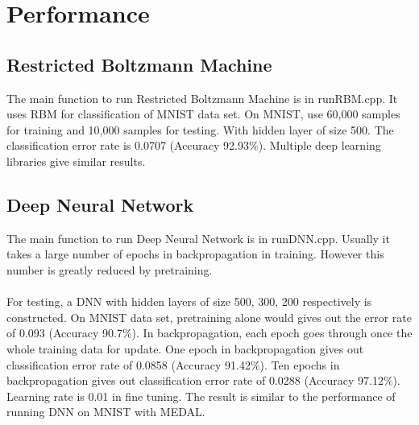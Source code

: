 \documentclass[12pt]{article}
\begin{document}
\section{Performance}
\subsection{Restricted Boltzmann Machine}
The main function to run Restricted Boltzmann Machine is in runRBM.cpp. It uses RBM for classification of MNIST data set. On MNIST, use 60,000 samples for training and 10,000 samples for testing. With hidden layer of size 500. The classification error rate is 0.0707 (Accuracy 92.93$\%$). Multiple deep learning libraries give similar results.
\subsection{Deep Neural Network}
The main function to run Deep Neural Network is in runDNN.cpp. Usually it takes a large number of epochs in backpropagation in training. However this number is greatly reduced by pretraining.\\
\\
For testing, a DNN with hidden layers of size 500, 300, 200 respectively is constructed. On MNIST data set, pretraining alone would gives out the error rate of 0.093 (Accuracy 90.7$\%$). In backpropagation, each epoch goes through once the whole training data for update. One epoch in backpropagation gives out classification error rate of 0.0858 (Accuracy 91.42$\%$). Ten epochs in backpropagation gives out classification error rate of 0.0288 (Accuracy 97.12$\%$). Learning rate is 0.01 in fine tuning. The result is similar to the performance of running DNN on MNIST with MEDAL. 
\end{document}
